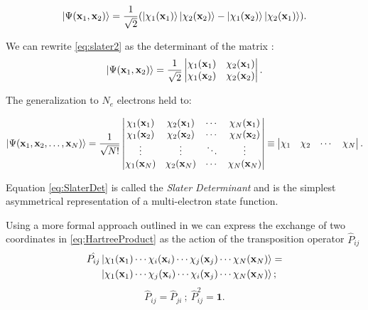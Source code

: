 \documentclass[a4paper,12pt]{article}
\begin{document}
\begin{equation}\label{eq:slater2}
	\ket{\Psi(\mathbf{x}_1,\mathbf{x}_2)} = \frac{1}{\sqrt{2}} (\ket{\chi_1(\mathbf{x}_1)} \ket{ \chi_2(\mathbf{x}_2)} - \ket{\chi_1(\mathbf{x}_2)} \ket{\chi_2(\mathbf{x}_1)} ).
\end{equation}

We can rewrite \eqref{eq:slater2} as the determinant of the matrix :
\begin{equation}
\ket{\Psi(\mathbf{x}_1,\mathbf{x}_2)} = \frac{1}{\sqrt{2}}
\begin{vmatrix}
\chi_1(\mathbf{x}_1) & \chi_2(\mathbf{x}_1) \\
\chi_1(\mathbf{x}_2) & \chi_2(\mathbf{x}_2) 
\end{vmatrix}.
\end{equation}

The generalization to $N_e$ electrons held to:

\begin{equation}\label{eq:SlaterDet}
\ket{\Psi(\mathbf{x}_1, \mathbf{x}_2, \ldots, \mathbf{x}_N)} =
\frac{1}{\sqrt{N!}}
\left|
	\begin{matrix} 
   		\chi_1(\mathbf{x}_1) & \chi_2(\mathbf{x}_1) & \cdots & \chi_N(\mathbf{x}_1) \\
        \chi_1(\mathbf{x}_2) & \chi_2(\mathbf{x}_2) & \cdots & \chi_N(\mathbf{x}_2) \\
		\vdots & \vdots & \ddots & \vdots \\
        \chi_1(\mathbf{x}_N) & \chi_2(\mathbf{x}_N) & \cdots & \chi_N(\mathbf{x}_N)
    \end{matrix} 
	\right|\equiv \left| 
	\begin{matrix}
		   \chi _1 & \chi _2 & \cdots  & \chi _N  \\
	\end{matrix}
   \right|.
\end{equation}

Equation \eqref{eq:SlaterDet} is called the \textit{Slater Determinant} and is the simplest asymmetrical representation of a multi-electron state function.

Using a more formal approach outlined in \cite[p.357-362]{Sakurai} we can express the exchange of two coordinates in \eqref{eq:HartreeProduct} as the action of the transposition operator $\hat{P}_{ij}$ 
\begin{align} \label{eq:transpositionOp}
	\begin{split}
		\hat{P_{ij}} & \ket{\chi_1(\mathbf{x}_1)   \cdots  \chi_i(\mathbf{x}_i)  \cdots  \chi_j(\mathbf{x}_j)  \cdots   \chi_N(\mathbf{x}_N)} =   \\ 
		& \ket{\chi_1(\mathbf{x}_1)   \cdots  \chi_j(\mathbf{x}_i)  \cdots  \chi_i(\mathbf{x}_j) \cdots  \chi_N(\mathbf{x}_N)} ;
	\end{split}
\end{align}
\begin{equation*}
	\hat{P}_{ij} = \hat{P}_{ji} ~;~
	\hat{P}_{ij}^2 = \mathbf{1}.
\end{equation*}
\end{document}
